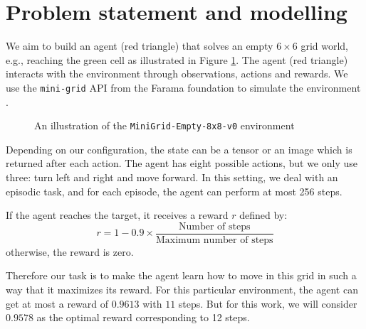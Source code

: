 \section{Problem statement and modelling}\label{sec1}
We aim to build an agent (red triangle) that solves an empty  $6\times6$ grid world, e.g., reaching the green cell as illustrated in Figure \ref{fig:mini-grid}. The agent (red triangle) interacts with the environment through observations, actions and rewards. We use the \texttt{mini-grid} API from the Farama foundation to simulate the environment \cite{minigrid}.
\begin{figure}
	\centering
	\caption{An illustration of the \texttt{MiniGrid-Empty-8x8-v0} environment}
	\label{fig:mini-grid}
\end{figure}

Depending on our configuration, the state can be a tensor or an image which is returned after each action. The agent has eight possible actions, but we only use three: turn left and right and move forward. In this setting, we deal with an episodic task, and for each episode, the agent can perform at most 256 steps.

If the agent reaches the target, it receives a reward $r$ defined by:
\begin{equation}
	r = 1 - 0.9\times \frac{\text{Number of steps}}{\text{Maximum number of steps}}
\end{equation}
otherwise, the reward is zero.


Therefore our task is to make the agent learn how to move in this grid in such a way that it maximizes its reward. For this particular environment, the agent can get at most a reward of $0.9613$ with $11$ steps. But for this work, we will consider $0.9578$ as the optimal reward corresponding to 12 steps.

